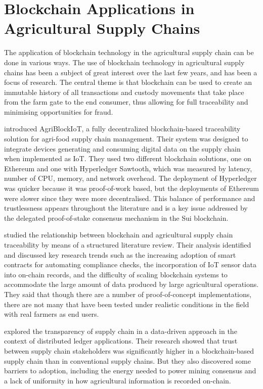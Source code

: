 \section{Blockchain Applications in Agricultural Supply Chains}

The application of blockchain technology in the agricultural supply chain can be done in various ways. The use of blockchain technology in agricultural supply chains has been a subject of great interest over the last few years, and has been a focus of research. The central theme is that blockchain can be used to create an immutable history of all transactions and custody movements that take place from the farm gate to the end consumer, thus allowing for full traceability and minimising opportunities for fraud.

\textcite{caro2018blockchain} introduced AgriBlockIoT, a fully decentralized blockchain-based traceability solution for agri-food supply chain management. Their system was designed to integrate devices generating and consuming digital data on the supply chain when implemented as IoT. They used two different blockchain solutions, one on Ethereum and one with Hyperledger Sawtooth, which was measured by latency, number of CPU, memory, and network overhead. The deployment of Hyperledger was quicker because it was proof-of-work based, but the deployments of Ethereum were slower since they were more decentralised. This balance of performance and trustlessness appears throughout the literature and is a key issue addressed by the delegated proof-of-stake consensus mechanism in the Sui blockchain.

\textcite{mirabelli2020blockchain} studied the relationship between blockchain and agricultural supply chain traceability by means of a structured literature review. Their analysis identified and discussed key research trends such as the increasing adoption of smart contracts for automating compliance checks, the incorporation of IoT sensor data into on-chain records, and the difficulty of scaling blockchain systems to accommodate the large amount of data produced by large agricultural operations. They said that though there are a number of proof-of-concept implementations, there are not many that have been tested under realistic conditions in the field with real farmers as end users.

\textcite{rahman2025enhancing} explored the transparency of supply chain in a data-driven approach in the context of distributed ledger applications. Their research showed that trust between supply chain stakeholders was significantly higher in a blockchain-based supply chain than in conventional supply chains. But they also discovered some barriers to adoption, including the energy needed to power mining consensus and a lack of uniformity in how agricultural information is recorded on-chain.

